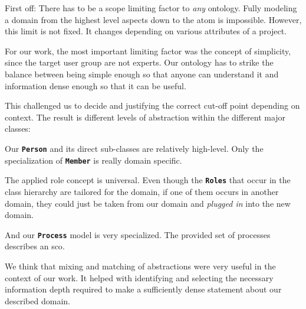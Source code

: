 \documentclass[a4paper, DIV=13, BCOR=0cm]{scrbook}
\newcommand{\class}[1]{\texttt{\textbf{#1}}}
\begin{document}
First off: There has to be a scope limiting factor to \textit{any} ontology. Fully modeling a domain from the highest level aspects down to the atom is impossible. However, this limit is not fixed. It changes depending on various attributes of a project.

For our work, the most important limiting factor was the concept of simplicity, since the target user group are not experts. Our ontology has to strike the balance between being simple enough so that anyone can understand it and information dense enough so that it can be useful.

This challenged us to decide and justifying the correct cut-off point depending on context. The result is different levels of abstraction within the different major classes: 
\begin{inparaenum}
	\item Our \class{Person} and its direct sub-classes are relatively high-level. Only the specialization of \class{Member} is really domain specific. 
	\item The applied role concept is universal. Even though the \class{Roles} that occur in the class hierarchy are tailored for the domain, if one of them occurs in another domain, they could just be taken from our domain and \textit{plugged in} into the new domain.
	\item And our \class{Process} model is very specialized. The provided set of processes describes an \gls{sco}.
\end{inparaenum}

We think that mixing and matching of abstractions were very useful in the context of our work. It helped with identifying and selecting the necessary information depth required to make a sufficiently dense statement about our described domain.
\end{document}
